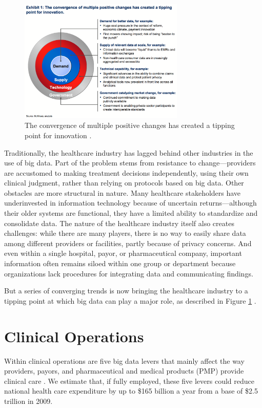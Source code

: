 \documentclass[twocolumn]{article}
\begin{document}
\begin{figure}[htb]
        \centering
        \includegraphics[width=0.7\textwidth]{convergence.png}
        \caption{The convergence of multiple positive changes has created a tipping point for innovation  \cite{Groves:2013}.}
        \label{fig:convergence}
\end{figure}

Traditionally, the healthcare industry has lagged behind other industries in the use of big data. Part of the problem stems from resistance to change—providers are accustomed to making treatment decisions independently, using their own clinical judgment, rather than relying on protocols based on big data. Other obstacles are more structural in nature. 
Many healthcare stakeholders have underinvested in information technology because of uncertain returns—although their older systems are functional, they have a limited ability to standardize and consolidate data. The nature of the healthcare industry itself also creates challenges: while there are many players, there is no way to easily share data among different providers or facilities, partly because of privacy concerns. And even within a single hospital, payor, or pharmaceutical company, important information often remains siloed within one group or department because organizations lack procedures for integrating data and communicating findings.

But a series of converging trends is now bringing the healthcare industry to a tipping point at which big data can play a major role, as described in Figure \ref{fig:convergence} . 

\section{Clinical Operations}
Within clinical operations are five big data levers that mainly affect the way providers, payors, and pharmaceutical and medical products (PMP) provide clinical care \cite{Manyika:2011}. We estimate that, if fully employed, these five levers could reduce national health care expenditure by up to \$165 billion a year from a base of \$2.5 trillion in 2009.
\end{document}
